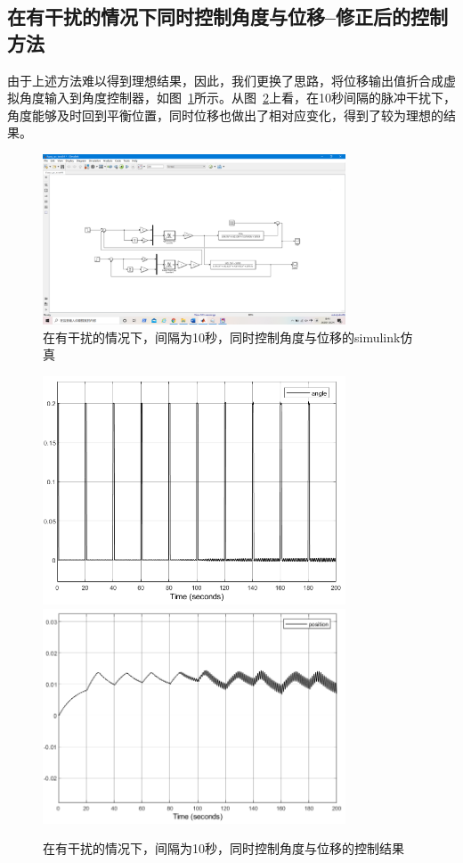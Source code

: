\subsection{在有干扰的情况下同时控制角度与位移--修正后的控制方法}
由于上述方法难以得到理想结果，因此，我们更换了思路，将位移输出值折合成虚拟角度输入到角度控制器，如图~\ref{fig:xiuzheng1}所示。从图~\ref{fig:xiuzheng2}上看，在10秒间隔的脉冲干扰下，角度能够及时回到平衡位置，同时位移也做出了相对应变化，得到了较为理想的结果。

\begin{figure}[hbpt]
\centering
\includegraphics[width=9cm]{xiuzheng1.png}

\caption{在有干扰的情况下，间隔为10秒，同时控制角度与位移的simulink仿真}\label{fig:xiuzheng1}
\end{figure}

\begin{figure}[hbpt]
\centering
\includegraphics[width=9cm]{xiuzheng2.png}
\includegraphics[width=9cm]{xiuzheng3.png}
\caption{在有干扰的情况下，间隔为10秒，同时控制角度与位移的控制结果}\label{fig:xiuzheng2}
\end{figure}

